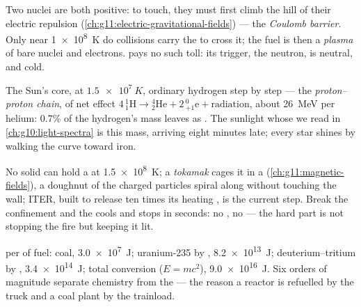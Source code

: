 \begin{definition}\label{def:g12:nuclear-energy:barrier}
Two nuclei are both positive: to touch, they must first climb the hill of
their electric repulsion (\cref{ch:g11:electric-gravitational-fields}) --- the
\emph{Coulomb barrier}. Only near \qty{1e8}{K} do
collisions carry the  to cross it; the fuel is then a
\emph{plasma} of bare nuclei and electrons.  pays no
such toll: its trigger, the neutron, is neutral, and  cold.
\end{definition}

\begin{example}\label{ex:g12:nuclear-energy:sun}
The Sun's core, at $\qty{1.5e7}{K}$,  ordinary hydrogen step by step ---
the \emph{proton--proton chain}, of net effect
$4\,{}^{1}_{1}\mathrm{H} \to {}^{4}_{2}\mathrm{He} + 2\,{}^{0}_{+1}\mathrm{e}
+ \text{radiation}$, about \qty{26}{MeV} per helium: $0.7\%$ of the
hydrogen's mass leaves as . The sunlight whose  we read in
\cref{ch:g10:light-spectra} is this mass, arriving eight minutes late; every
star shines by walking the curve toward iron.
\end{example}

\begin{remark}\label{rem:g12:nuclear-energy:iter}
No solid can hold a  at \qty{1.5e8}{K}; a \emph{tokamak} cages it in a
 (\cref{ch:g11:magnetic-fields}), a doughnut of  the
charged particles spiral along without touching the wall; ITER, built to
release ten times its heating , is the current step. Break the
confinement and the  cools and stops in seconds: no , no
 --- the hard part is not stopping the fire but keeping it lit.
\end{remark}

\begin{example}\label{ex:g12:nuclear-energy:ladder}
 per  of fuel: coal, \qty{3.0e7}{J}; uranium-235 by ,
\qty{8.2e13}{J}; deuterium--tritium by , \qty{3.4e14}{J}; total
conversion ($E = mc^2$), \qty{9.0e16}{J}. Six orders of magnitude separate
chemistry from the  --- the reason a reactor is refuelled by the truck
and a coal plant by the trainload.
\end{example}

